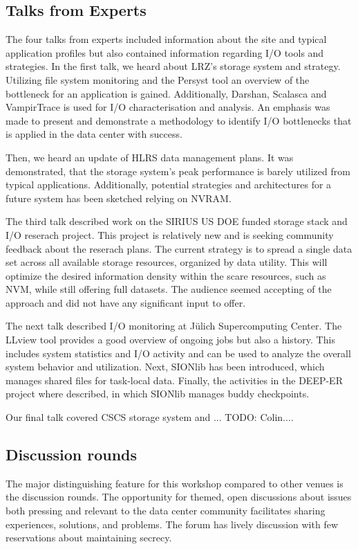 \documentclass{llncs}
\begin{document}
\subsection{Talks from Experts}

The four talks from experts included information about the site and typical application profiles but also contained information regarding I/O tools and strategies. 
In the first talk, we heard about LRZ's storage system and strategy.
Utilizing file system monitoring and the Persyst tool an overview of the bottleneck for an application is gained.
Additionally, Darshan, Scalasca and VampirTrace is used for I/O characterisation and analysis.
An emphasis was made to present and demonstrate a methodology to identify I/O bottlenecks that is applied in the data center with success.

Then, we heard an update of HLRS data management plans.
It was demonstrated, that the storage system's peak performance is barely utilized from typical applications.
Additionally, potential strategies and architectures for a future system has been sketched relying on NVRAM.

The third talk described work on the SIRIUS US DOE funded storage stack and I/O reserach project. This project is relatively new and is seeking community feedback about the reserach plans. The current strategy is to spread a single data set across all available storage resources, organized by data utility. This will optimize the desired information density within the scare resources, such as NVM, while still offering full datasets. The audience seemed accepting of the approach and did not have any significant input to offer.

The next talk described I/O monitoring at Jülich Supercomputing Center.
The LLview tool provides a good overview of ongoing jobs but also a history. 
This includes system statistics and I/O activity and can be used to analyze the overall system behavior and utilization.
Next, SIONlib has been introduced, which manages shared files for task-local data.
Finally, the activities in the DEEP-ER project where described, in which SIONlib manages buddy checkpoints.

Our final talk covered CSCS storage system and ...
TODO: Colin....


\subsection{Discussion rounds}

The major distinguishing feature for this workshop compared to other venues is the discussion rounds. The opportunity for themed, open discussions about issues both pressing and relevant to the data center community facilitates sharing experiences, solutions, and problems. The forum has lively discussion with few reservations about maintaining secrecy.
\end{document}
